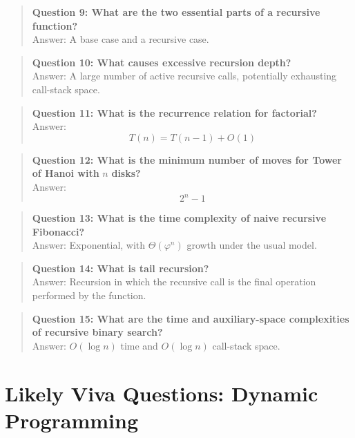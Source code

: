 \begin{quote}
\textbf{Question 9: What are the two essential parts of a recursive function?}\\[4pt]
Answer: A base case and a recursive case.
\end{quote}
\begin{quote}
\textbf{Question 10: What causes excessive recursion depth?}\\[4pt]
Answer: A large number of active recursive calls, potentially exhausting call-stack space.
\end{quote}
\begin{quote}
\textbf{Question 11: What is the recurrence relation for factorial?}\\[4pt]
Answer: 
\[
T(n)=T(n-1)+O(1)
\]

\end{quote}
\begin{quote}
\textbf{Question 12: What is the minimum number of moves for Tower of Hanoi with }$n$\textbf{ disks?}\\[4pt]
Answer: 
\[
2^n-1
\]

\end{quote}
\begin{quote}
\textbf{Question 13: What is the time complexity of naive recursive Fibonacci?}\\[4pt]
Answer: Exponential, with $\Theta(\varphi^n)$ growth under the usual model.
\end{quote}
\begin{quote}
\textbf{Question 14: What is tail recursion?}\\[4pt]
Answer: Recursion in which the recursive call is the final operation performed by the function.
\end{quote}
\begin{quote}
\textbf{Question 15: What are the time and auxiliary-space complexities of recursive binary search?}\\[4pt]
Answer: $O(\log n)$ time and $O(\log n)$ call-stack space.
\end{quote}
\section{Likely Viva Questions: Dynamic Programming}

